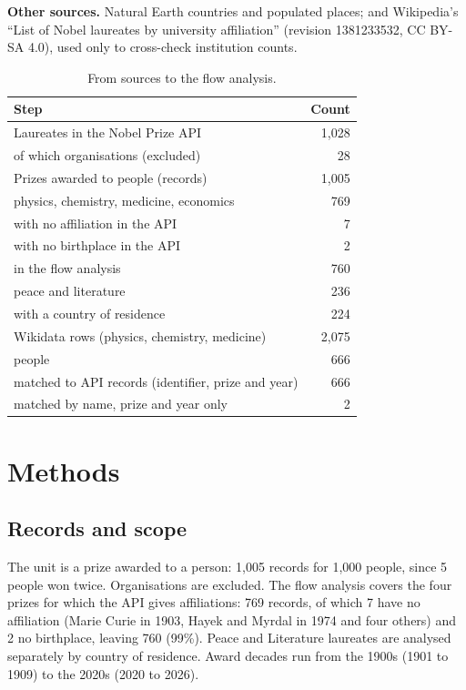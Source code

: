 \documentclass[11pt,a4paper]{article}
\begin{document}
\textbf{Other sources.} Natural Earth \citep{naturalearth} countries and populated places; and Wikipedia's ``List of Nobel laureates by university affiliation'' (revision 1381233532, CC BY-SA 4.0), used only to cross-check institution counts.

\begin{table}[tbp]\centering\small\caption{From sources to the flow analysis.}\label{tab:pipe}\begin{tabular}{p{10.5cm}r}\toprule Step & Count\\\midrule
Laureates in the Nobel Prize API & 1,028\\
\quad of which organisations (excluded) & 28\\
Prizes awarded to people (records) & 1,005\\
\quad physics, chemistry, medicine, economics & 769\\
\quad\quad with no affiliation in the API & 7\\
\quad\quad with no birthplace in the API & 2\\
\quad\quad in the flow analysis & 760\\
\quad peace and literature & 236\\
\quad\quad with a country of residence & 224\\
Wikidata rows (physics, chemistry, medicine) & 2,075\\
\quad people & 666\\
\quad matched to API records (identifier, prize and year) & 666\\
\quad matched by name, prize and year only & 2\\
\bottomrule\end{tabular}\end{table}

\section{Methods}
\subsection{Records and scope}
The unit is a prize awarded to a person: 1,005 records for 1,000 people, since 5 people won twice. Organisations are excluded. The flow analysis covers the four prizes for which the API gives affiliations: 769 records, of which 7 have no affiliation (Marie Curie in 1903, Hayek and Myrdal in 1974 and four others) and 2 no birthplace, leaving 760 (99\%). Peace and Literature laureates are analysed separately by country of residence. Award decades run from the 1900s (1901 to 1909) to the 2020s (2020 to 2026).
\end{document}
